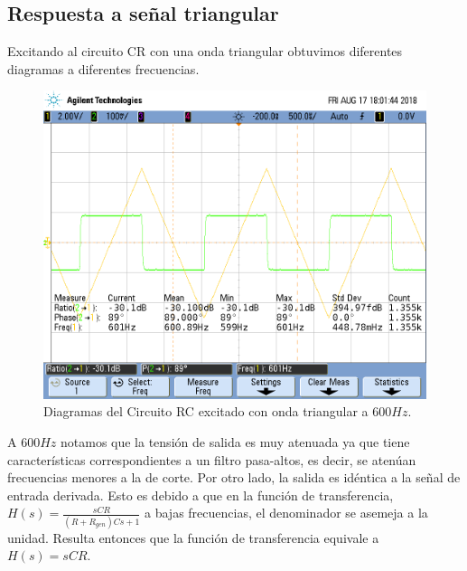 \subsection{Respuesta a señal triangular}

Excitando al circuito CR con una onda triangular obtuvimos diferentes diagramas a diferentes frecuencias.

\begin{figure}[H]
\centering
\includegraphics[scale=0.3]{2_601.png}
\caption{Diagramas del Circuito RC excitado con onda triangular a $600Hz$.}
\label{fig:CR}
\end{figure}

A $600Hz$ notamos que la tensión de salida es muy atenuada ya que tiene características correspondientes a un filtro pasa-altos, es decir, se atenúan frecuencias menores a la de corte. Por otro lado, la salida es idéntica a la señal de entrada derivada. Esto es debido a que en la función de transferencia, $H(s) = \frac{sCR}{\left(R+R_{gen}\right)Cs+1}$ a bajas frecuencias, el denominador se asemeja a la unidad. Resulta entonces que la función de transferencia equivale a $H(s) = sCR $.

